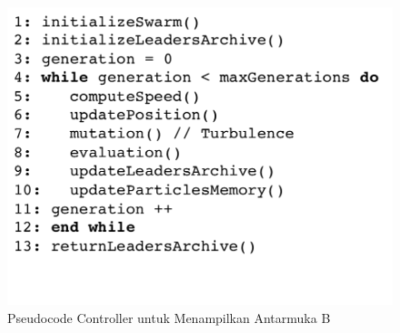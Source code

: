       \begin{figure}[H]
        \centering
        \includegraphics[width=\linewidth]{images/bab4/smpso_code.png}
        \caption{ Pseudocode Controller untuk Menampilkan Antarmuka B }
        \label{pdm}
      \end{figure}